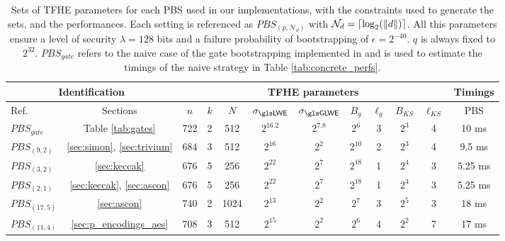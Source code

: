 \begin{table}
    \centering
    \small %
    \begin{tabular}{|l|c||c|c|c|c|c|c|c|c|c||c|}
            \hline
        \multicolumn{2}{|c||}{\textbf{Identification}} & \multicolumn{9}{c||}{\textbf{\gls{TFHE} parameters}} & \textbf{Timings} \\
        \hline
        Ref. & Sections & $n$ & $k$ & $N$ & $\sigma_{\texttt{\LWE}}$ & $\sigma_{\texttt{\GLWE}}$ & $B_g$ & $\ell_g$ & $B_{KS}$ & $\ell_{KS}$ & \gls{PBS}\\
        \hline
        \hline
            \texttt{$PBS_{gate}$} & Table \ref{tab:gates} & 722 & 2 & 512 & $2^{16.2}$ & $2^{7.8}$ & $2^6$ & 3 & $2^3$ & 4 & 10 ms\\
           \hline
          \hline
        \texttt{$PBS_{(9, 2)}$} & \ref{sec:simon}, \ref{sec:trivium} & 684 & 3 & 512 & $2^{16}$ & $2^{2}$& $2^{10}$ & 2 & $2^3$ & 4 & 9.5 ms\\
           \hline
       
        \texttt{$PBS_{(3, 2)}$} & \ref{sec:keccak} & 676 & 5 & 256 & $2^{22}$ & $2^{7}$& $2^{18}$ & 1 & $2^4$ & 3 & 5.25 ms \\
          \hline
    
        \texttt{$PBS_{(2, 1)}$} & \ref{sec:keccak}, \ref{sec:ascon} & 676 & 5 & 256 & $2^{22}$ & $2^{7}$& $2^{18}$ & 1 & $2^4$ & 3 & 5.25 ms \\
         \hline
        
        \texttt{$PBS_{(17, 5)}$} & \ref{sec:ascon} & 740 & 2 & 1024 & $2^{13}$ & $2^{2}$& $2^7$ & 3 & $2^5$ & 3 & 18 ms\\
         \hline
        
        \texttt{$PBS_{(11, 4)}$} & \ref{sec:p_encodings_aes} & 708 & 3 & 512 & $2^{15}$ & $2^{2}$& $2^6$ & 4 & $2^2$ & 7 & 17 ms  \\
            \hline
       \end{tabular}

    \medskip 
    
    \caption{Sets of \gls{TFHE} parameters for each \gls{PBS} used in our implementations, with the constraints used to generate the sets, and the performances. Each setting is referenced as \texttt{$PBS_{(p, \mathcal{N}_d)}$} with $\mathcal{N}_d = \lceil \log_2(\lVert d \rVert)\rceil$. All this parameters ensure a level of security $\lambda=128$ bits and a failure probability of bootstrapping of $\epsilon=2^{-40}$. $q$ is always fixed to $2^{32}$. \texttt{$PBS_{gate}$} refers to the naive case of the gate bootstrapping implemented in \cite{tfhe-rs} and is used to estimate the timings of the naive strategy in Table \ref{tab:concrete_perfs}.}
    \label{tab:p_encodings_parameters}
\end{table}




